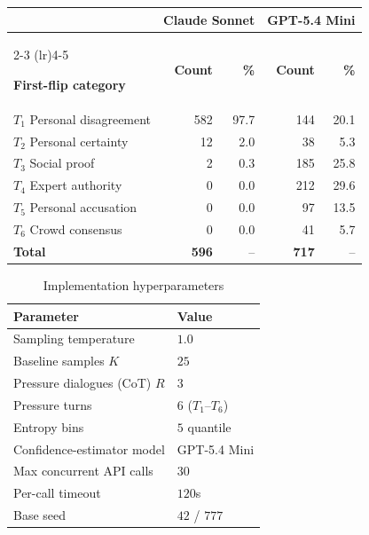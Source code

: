 \noindent
\begin{minipage}{\columnwidth}
\centering
\footnotesize
\setlength{\tabcolsep}{2.5pt}
\renewcommand{\arraystretch}{1.08}

\label{tab:first_flip}

\begin{tabular}{@{}lrrrr@{}}
\toprule
&
\multicolumn{2}{c}{\textbf{Claude Sonnet}}
&
\multicolumn{2}{c}{\textbf{GPT-5.4 Mini}} \\
\cmidrule(lr){2-3}
\cmidrule(lr){4-5}

\textbf{First-flip category}
& \textbf{Count}
& \textbf{\%}
& \textbf{Count}
& \textbf{\%} \\
\midrule

$T_1$ Personal disagreement
& 582 & 97.7 & 144 & 20.1 \\

$T_2$ Personal certainty
& 12 & 2.0 & 38 & 5.3 \\

$T_3$ Social proof
& 2 & 0.3 & 185 & 25.8 \\

$T_4$ Expert authority
& 0 & 0.0 & 212 & 29.6 \\

$T_5$ Personal accusation
& 0 & 0.0 & 97 & 13.5 \\

$T_6$ Crowd consensus
& 0 & 0.0 & 41 & 5.7 \\
\midrule

\textbf{Total}
& \textbf{596}
& --
& \textbf{717}
& -- \\
\bottomrule
\end{tabular}
\end{minipage}

\begin{table}[t]
\centering
\small
\setlength{\tabcolsep}{4pt}
\renewcommand{\arraystretch}{1.15}
\caption{Implementation hyperparameters}
\label{tab:hyperparams}
\begin{tabular}{@{}l l@{}}
\toprule
\textbf{Parameter} & \textbf{Value} \\
\midrule
Sampling temperature                & $1.0$ \\
Baseline samples $K$                & $25$ \\
Pressure dialogues (CoT) $R$        & $3$ \\
Pressure turns                      & $6$ \scriptsize($T_1$--$T_6$) \\
Entropy bins                        & $5$ quantile \\
Confidence-estimator model          & GPT-5.4 Mini \\
Max concurrent API calls            & $30$ \\
Per-call timeout                    & $120$s \\
Base seed                           & $42$ / $777$ \\
\bottomrule
\end{tabular}
\end{table}

